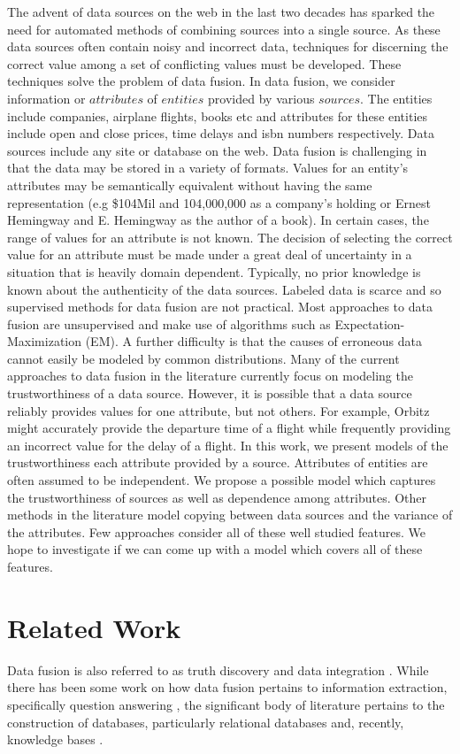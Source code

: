 \documentclass{acm_proc_article-sp}
\begin{document}
The advent of data sources on the web in the last two decades has sparked the need for automated methods of combining sources into a single source. As these data sources often contain noisy and incorrect data, techniques for discerning the correct value among a set of conflicting values must be developed. These techniques solve the problem of data fusion. In data fusion, we consider information or $attributes$ of $entities$ provided by various $sources$. The entities include companies, airplane flights, books etc and attributes for these entities include open and close prices, time delays and isbn numbers respectively. Data sources include any site or database on the web. Data fusion is challenging in that the data may be stored in a variety of formats. Values for an entity's attributes may be semantically equivalent without having the same representation (e.g \$104Mil and 104,000,000 as a company's holding or Ernest Hemingway and E. Hemingway as the author of a book). In certain cases, the range of values for an attribute is not known. The decision of selecting the correct value for an attribute must be made under a great deal of uncertainty in a situation that is heavily domain dependent. Typically, no prior knowledge is known about the authenticity of the data sources. Labeled data is scarce and so supervised methods for data fusion are not practical. Most approaches to data fusion are unsupervised and make use of algorithms such as Expectation-Maximization (EM). A further difficulty is that the causes of erroneous data cannot easily be modeled by common distributions. Many of the current approaches to data fusion in the literature currently focus on modeling the trustworthiness of a data source. However, it is possible that a data source reliably provides values for one attribute, but not others. For example, Orbitz might accurately provide the departure time of a flight while frequently providing an incorrect value for the delay of a flight. In this work, we present models of the trustworthiness each attribute provided by a source. Attributes of entities are often assumed to be independent. We propose a possible model which captures the trustworthiness of sources as well as dependence among attributes.  Other methods in the literature model copying between data sources and the variance of the attributes. Few approaches consider all of these well studied features. We hope to investigate if we can come up with a model which covers all of these features. 

\section{Related Work}
Data fusion is also referred to as truth discovery \cite{waguih:truth} \cite{yin:truth} and data integration \cite{sarma:data} \cite{zhao:bayesian}. While there has been some work on how data fusion pertains to information extraction, specifically question answering \cite{wu:corroborating}, the significant body of literature pertains to the construction of databases, particularly relational databases and, recently, knowledge bases \cite{dong:data}. 
\end{document}
